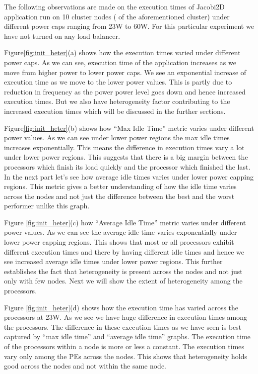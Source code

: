 The following observations are made on the execution times of Jacobi2D application
run on 10 cluster nodes ( of the aforementioned cluster) under different power caps ranging from 
23W to 60W. For this particular experiment we have not turned on any load balancer.

Figure\ref{fig:init_heter}(a) shows how the execution times varied under
different power caps.  As we can see, execution time of the application
increases as we move from higher power to lower power caps. We see an
exponential increase of execution time as we move to the lower power values.
This is partly due to reduction in frequency as the power power level goes down
and hence increased execution times. But we also have heterogeneity factor
contributing to the increased execution times which will be discussed in the
further sections.

Figure\ref{fig:init_heter}(b) shows how “Max Idle Time” metric varies under
 different power values.  As we can see under lower power regions the max idle
 times increases exponentially. This means the difference in execution times
 vary a lot under lower power regions. This suggests that there is a big margin
 between the processors which finish its load quickly and the processor which
 finished the last. In the next part let’s see how average idle times varies
 under lower power capping regions. This metric gives a better understanding of
 how the idle time varies across the nodes and not just the difference between
 the best and the worst performer unlike this graph.


Figure \ref{fig:init_heter}(c) how “Average Idle Time” metric varies under
different power values. As we can see the average idle time varies exponentially
under lower power capping regions. This shows that most or all processors
exhibit different execution times and there by having different idle times and
hence we see increased average idle times under lower power regions. This
further establishes the fact that heterogeneity is present across the nodes and
not just only with few nodes. Next we will show the extent of
heterogeneity among the processors. 


Figure \ref{fig:init_heter}(d) shows how the execution time has varied
across the processors at 23W. As we see we have huge difference in
execution times among the processors. The difference in these execution times
as we have seen is best captured by “max idle time” and “average idle time”
graphs. The execution time of the processors within a node is more or less a
constant. The execution times vary only among the PEs across the nodes. This
shows that heterogeneity holds good across the nodes and not within the same
node.
